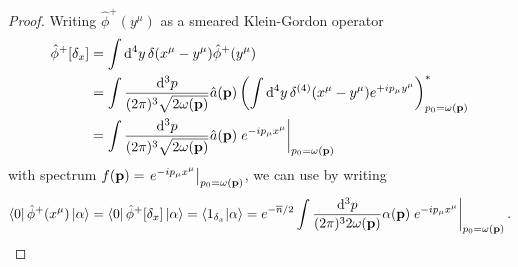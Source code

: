 \qkgcoherentwavefunction
\begin{proof}
	Writing $\hat\phi^+(y^\mu)$ as a smeared Klein-Gordon operator
	\begin{equation*}
		\begin{split}
			\hat\phi^+[\delta_x]
			&=
			\int\dd[4]{y}
			\delta(x^\mu-y^\mu)
			\hat\phi^+(y^\mu)
			\\
			&=
			\int\frac{\dd[3]{p}}{(2\pi)^3\sqrt{2\omega(\vb{p})}}
			\hat{a}(\vb{p})
			\left(
				\int\dd[4]{y}
				\delta^{(4)}(x^\mu-y^\mu)
				e^{+ip_\mu y^\mu}
			\right)_{p_0=\omega(\vb{p})}^*
			\\
			&=
			\int\frac{\dd[3]{p}}{(2\pi)^3\sqrt{2\omega(\vb{p})}}
			\hat{a}(\vb{p})
			\eval{e^{-ip_\mu x^\mu}}_{p_0=\omega(\vb{p})}
		\end{split}
	\end{equation*}
	with spectrum $f(\vb{p})=\eval{e^{-ip_\mu x^\mu}}_{p_0=\omega(\vb{p})}$, we can use  by writing
	\begin{equation*}
		\begin{split}
			\bra{0}
			\hat\phi^+(x^\mu)
			\ket{\alpha}
			=
			\bra{0}
			\hat\phi^+[\delta_x]
			\ket{\alpha}
			=
			\bra{1_{\delta_x}}
			\ket{\alpha}
			=
			e^{-\overline{n}/2}
			\int\frac{\dd[3]{p}}{(2\pi)^32\omega(\vb{p})}
			\alpha(\vb{p})
			\eval{e^{-ip_\mu x^\mu}}_{p_0=\omega(\vb{p})}
			.
		\end{split}
	\end{equation*}
\end{proof}

